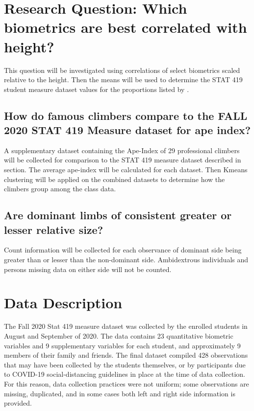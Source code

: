 \documentclass[]{article}
\begin{document}
\section{Research Question:  Which biometrics are best correlated with height?}
\label{sec:rq}

This question will be investigated using correlations of select
biometrics scaled relative to the height. Then the means will be used to
determine the STAT 419 student measure dataset values for the
proportions listed by \citet{Thomas:2020}.

\subsection{How do famous climbers compare to the FALL 2020 STAT 419 Measure dataset for ape index?} 
\label{sec:rq2}

A supplementary dataset containing the Ape-Index of 29 professional
climbers will be collected for comparison to the STAT 419 measure
dataset described in section. The average ape-index will be calculated
for each dataset. Then Kmeans clustering will be applied on the combined
datasets to determine how the climbers group among the class data.

\subsection{Are dominant limbs of consistent greater or lesser relative size?}
\label{sec:rq3}

Count information will be collected for each observance of dominant side
being greater than or lesser than the non-dominant side. Ambidextrous
individuals and persons missing data on either side will not be counted.

\section{Data Description}
\label{sec:data}

The Fall 2020 Stat 419 measure dataset was collected by the enrolled
students in August and September of 2020. The data contains 23
quantitative biometric variables and 9 supplementary variables for each
student, and approximately 9 members of their family and friends. The
final dataset compiled 428 observations that may have been collected by
the students themselves, or by participants due to COVID-19
social-distancing guidelines in place at the time of data collection.
For this reason, data collection practices were not uniform; some
observations are missing, duplicated, and in some cases both left and
right side information is provided.
\end{document}
